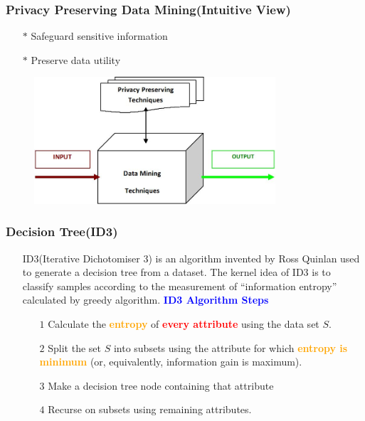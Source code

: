 \documentclass{beamer} %
\newcommand{\blue}[1]{\textcolor{blue}{#1}}
\newcommand{\red}[1]{\textcolor{red}{#1}}
\newcommand{\orange}[1]{\textcolor{orange}{#1}}
\begin{document}
\begin{frame}
\frametitle{Privacy Preserving Data Mining(Intuitive View)}

\begin{itemize} \itemsep2pt \parskip0pt 
    \item[$\ast$] Safeguard sensitive information
    \item[$\ast$] Preserve data utility
\end{itemize}
\begin{figure}[H]
\centering
\includegraphics[width=0.8\textwidth]{./PPDM.jpg}
\end{figure}



\end{frame}

\begin{frame}
\frametitle{Decision Tree(ID3)}
\begin{itemize} \itemsep2pt \parskip0pt 
    \item[] ID3(Iterative Dichotomiser 3) is an algorithm invented by Ross Quinlan used to generate a decision tree from a dataset. The kernel idea of ID3 is to classify samples according to the measurement of ``information entropy'' calculated by greedy algorithm.\newline\newline\newline
    \blue{\bf ID3 Algorithm Steps}
    \begin{itemize} \itemsep1pt \parskip0pt 
        \item[$1$] Calculate the \orange{\bf entropy} of \red{\bf every attribute} using the data set $S$.
        \item[$2$] Split the set $S$ into subsets using the attribute for which \orange{\bf entropy is minimum} (or, equivalently, information gain is maximum).
        \item[$3$] Make a decision tree node containing that attribute
        \item[$4$] Recurse on subsets using remaining attributes.
    \end{itemize}
\end{itemize}



\end{frame}
\end{document}
